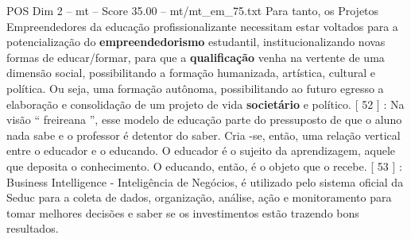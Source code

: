 \begin{textsample}{POS Dim 2 – mt – Score 35.00 – mt/mt\_em\_75.txt}
Para tanto, os Projetos Empreendedores da educação profissionalizante necessitam estar voltados para a potencialização do \textbf{empreendedorismo} estudantil, institucionalizando novas formas de educar/formar, para que a \textbf{qualificação} venha na vertente de uma dimensão social, possibilitando a formação humanizada, artística, cultural e política.
Ou seja, uma formação autônoma, possibilitando ao futuro egresso a elaboração e consolidação de um projeto de vida \textbf{societário} e político. [ 52 ] : Na visão “ freireana ”, esse modelo de educação parte do pressuposto de que o aluno nada sabe e o professor é detentor do saber.
Cria -se, então, uma relação vertical entre o educador e o educando.
O educador é o sujeito da aprendizagem, aquele que deposita o conhecimento.
O educando, então, é o objeto que o recebe. [ 53 ] : Business Intelligence - Inteligência de Negócios, é utilizado pelo sistema oficial da Seduc para a coleta de dados, organização, análise, ação e monitoramento para tomar melhores decisões e saber se os investimentos estão trazendo bons resultados.

\end{textsample}
